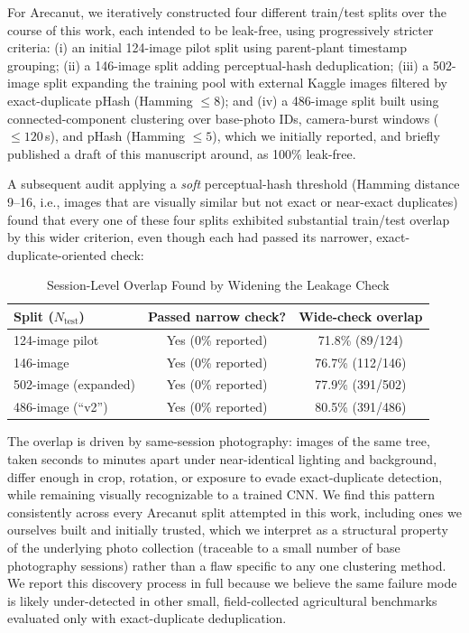 \documentclass[conference]{IEEEtran}
\begin{document}
For Arecanut, we iteratively constructed four different train/test splits over the course of this work, each intended to be leak-free, using progressively stricter criteria: (i) an initial 124-image pilot split using parent-plant timestamp grouping; (ii) a 146-image split adding perceptual-hash deduplication; (iii) a 502-image split expanding the training pool with external Kaggle images filtered by exact-duplicate pHash (Hamming $\le 8$); and (iv) a 486-image split built using connected-component clustering over base-photo IDs, camera-burst windows ($\le 120$\,s), and pHash (Hamming $\le 5$), which we initially reported, and briefly published a draft of this manuscript around, as 100\% leak-free.

A subsequent audit applying a \emph{soft} perceptual-hash threshold (Hamming distance 9--16, i.e., images that are visually similar but not exact or near-exact duplicates) found that every one of these four splits exhibited substantial train/test overlap by this wider criterion, even though each had passed its narrower, exact-duplicate-oriented check:

\begin{table}[htbp]
\caption{Session-Level Overlap Found by Widening the Leakage Check}
\centering\footnotesize
\begin{tabular}{lcc}
\toprule
\textbf{Split ($N_{\text{test}}$)} & \textbf{Passed narrow check?} & \textbf{Wide-check overlap} \\
\midrule
124-image pilot & Yes (0\% reported) & 71.8\% (89/124) \\
146-image & Yes (0\% reported) & 76.7\% (112/146) \\
502-image (expanded) & Yes (0\% reported) & 77.9\% (391/502) \\
486-image (``v2'') & Yes (0\% reported) & 80.5\% (391/486) \\
\bottomrule
\end{tabular}
\label{tab:leakage_discovery}
\end{table}

The overlap is driven by same-session photography: images of the same tree, taken seconds to minutes apart under near-identical lighting and background, differ enough in crop, rotation, or exposure to evade exact-duplicate detection, while remaining visually recognizable to a trained CNN. We find this pattern consistently across every Arecanut split attempted in this work, including ones we ourselves built and initially trusted, which we interpret as a structural property of the underlying photo collection (traceable to a small number of base photography sessions) rather than a flaw specific to any one clustering method. We report this discovery process in full because we believe the same failure mode is likely under-detected in other small, field-collected agricultural benchmarks evaluated only with exact-duplicate deduplication.
\end{document}
